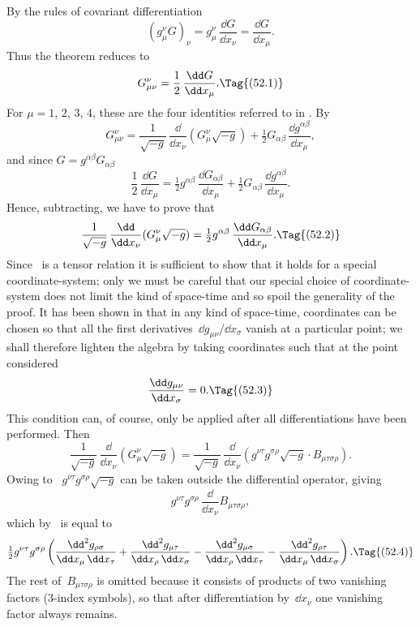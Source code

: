 \documentclass[12pt]{book}
\begin{document}
By the rules of covariant differentiation
\[
(g_{\mu}^{\nu} G)_{\nu} = g_{\mu}^{\nu}\, \frac{\dd G}{\dd x_{\nu}} = \frac{\dd G}{\dd x_{\mu}}.
\]
Thus the theorem reduces to
\[
G_{\mu\nu}^{\nu} = \frac{1}{2}\, \frac{\dd G}{\dd x_{\mu}}.
\Tag{(52.1)}
\]
For $\mu = 1$, $2$, $3$, $4$, these are the four identities referred to in . By~
\[
G_{\mu\nu}^{\nu}
= \frac{1}{\sqrt{-g}}\, \frac{\dd}{\dd x_{\nu}} (G_{\mu}^{\nu} \sqrt{-g})
+ \tfrac{1}{2} G_{\alpha\beta}\, \frac{\dd g^{\alpha\beta}}{\dd x_{\mu}},
\]
and since $G = g^{\alpha\beta} G_{\alpha\beta}$
\[
\frac{1}{2}\, \frac{\dd G}{\dd x_{\mu}}
= \tfrac{1}{2} g^{\alpha\beta}\, \frac{\dd G_{\alpha\beta}}{\dd x_{\mu}}
+ \tfrac{1}{2} G_{\alpha\beta}\, \frac{\dd g^{\alpha\beta}}{\dd x_{\mu}}.
\]
Hence, subtracting, we have to prove that
\[
\frac{1}{\sqrt{-g}}\, \frac{\dd}{\dd x_{\nu}} (G_{\mu}^{\nu} \sqrt{-g})
= \tfrac{1}{2} g^{\alpha\beta}\, \frac{\dd G_{\alpha\beta}}{\dd x_{\mu}}.
\Tag{(52.2)}
\]
Since ~is a tensor relation it is sufficient to show that it holds for a special
coordinate-system; only we must be careful that our special choice of coordinate-system
does not limit the kind of space-time and so spoil the generality
of the proof. It has been shown in  that in any kind of space-time, coordinates
can be chosen so that all the first derivatives~$\dd g_{\mu\nu}/\dd x_{\sigma}$ vanish at a
particular point; we shall therefore lighten the algebra by taking coordinates
such that at the point considered
\[
\frac{\dd g_{\mu\nu}}{\dd x_{\sigma}} = 0.
\Tag{(52.3)}
\]
This condition can, of course, only be applied after all differentiations have
been performed. Then
\[
\frac{1}{\sqrt{-g}}\, \frac{\dd}{\dd x_{\nu}} (G_{\mu}^{\nu} \sqrt{-g})
= \frac{1}{\sqrt{-g}}\, \frac{\dd}{\dd x_{\nu}} (g^{\nu\tau} g^{\sigma\rho} \sqrt{-g}\cdot B_{\mu\tau\sigma\rho}).
\]
Owing to~ $g^{\nu\tau} g^{\sigma\rho} \sqrt{-g}$ can be taken outside the differential operator,
giving
\[
g^{\nu\tau} g^{\sigma\rho}\, \frac{\dd}{\dd x_{\nu}} B_{\mu\tau\sigma\rho},
\]
which by~ is equal to
\[
\tfrac{1}{2} g^{\nu\tau} g^{\sigma\rho} \left(
  \frac{\dd^{2} g_{\rho\sigma}}{\dd x_{\mu}\, \dd x_{\tau}}
  + \frac{\dd^{2} g_{\mu\tau}}{\dd x_{\rho}\, \dd x_{\sigma}}
  - \frac{\dd^{2} g_{\mu\sigma}}{\dd x_{\rho}\, \dd x_{\tau}}
  - \frac{\dd^{2} g_{\rho\tau}}{\dd x_{\mu}\, \dd x_{\sigma}}\right).
\Tag{(52.4)}
\]
The rest of~$B_{\mu\tau\sigma\rho}$ is omitted because it consists of products of two vanishing
factors ($3$-index symbols), so that after differentiation by~$\dd x_{\nu}$ one vanishing
factor always remains.
\end{document}

